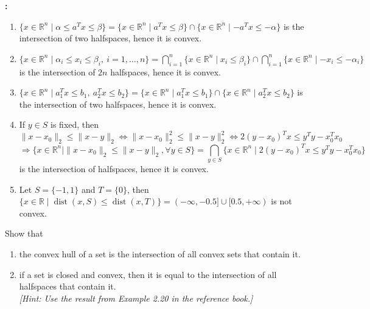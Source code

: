 \documentclass[11pt,letter,notitlepage]{article}
\theoremstyle{definition}
\begin{document}
\begin{solution}\textbf{:}
\begin{enumerate}
    \item[(a)] $\{ x \in \mathbb{R}^n \mid \alpha \le a^T x \le \beta\} = \{x \in \mathbb{R}^n \mid a^T x \le \beta\} \cap \{x \in \mathbb{R}^n \mid -a^T x \le -\alpha\}$ is the intersection of two halfspaces, hence it is convex.
    \item[(b)] $\{x \in \mathbb{R}^n \mid \alpha_i \le x_i \le \beta_i,\ i=1,\dots,n\} = \bigcap_{i=1}^n \{x \in \mathbb{R}^n \mid x_i \le \beta_i\} \cap \bigcap_{i=1}^n \{x \in \mathbb{R}^n \mid -x_i \le -\alpha_i\}$ is the intersection of $2n$ halfspaces, hence it is convex.
    \item[(c)] $\{x \in \mathbb{R}^n \mid a_1^T x \le b_1,\ a_2^T x \le b_2\} = \{x \in \mathbb{R}^n \mid a_1^T x \le b_1\} \cap \{x \in \mathbb{R}^n \mid a_2^T x \le b_2\}$ is the intersection of two halfspaces, hence it is convex.
    \item[(d)] If $y \in S$ is fixed, then
    $$
    \|x-x_0\|_2 \le \|x-y\|_2 \Longleftrightarrow \|x-x_0\|_2^2 \le \|x-y\|_2^2 \Longleftrightarrow 2(y-x_0)^T x \le y^T y - x_0^T x_0
    $$
    $$
    \Longrightarrow
    \{x \in \mathbb{R}^n \mid \|x-x_0\|_2 \le \|x-y\|_2, \forall y \in S\} = \bigcap_{y \in S} \{x \in \mathbb{R}^n \mid 2(y-x_0)^T x \le y^T y - x_0^T x_0\}
    $$
    is the intersection of halfspaces, hence it is convex.
    \item[(e)] Let $S = \{-1,1\}$ and $T = \{0\}$, then $\{x \in \mathbb{R} \mid \operatorname{dist}(x,S) \le \operatorname{dist}(x,T)\} = (-\infty,-0.5] \cup [0.5,+\infty)$ is not convex.
\end{enumerate}
\end{solution}

\newpage

\begin{exercise}[ ]
    Show that

\begin{enumerate}
    \item[(a)] the convex hull of a set is the intersection of all convex sets that contain it.
    \item[(b)] if a set is closed and convex, then it is equal to the intersection of all halfspaces that contain it. \\
    \textit{[Hint: Use the result from Example 2.20 in the reference book.]}
\end{enumerate}
\end{exercise}
\end{document}
